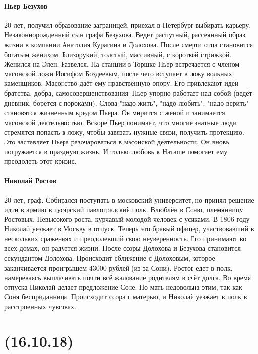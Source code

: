 \documentclass{article}
\begin{document}
\paragraph{Пьер Безухов}
20 лет, получил образование заграницей, приехал в Петербург выбирать карьеру. Незаконнорожденный сын графа Безухова.
Ведет распутный, рассеянный образ жизни в компании Анатолия Курагина и Долохова. После смерти отца становится
богатым женихом. Близорукий, толстый, массивный, с короткой стрижкой. Женился на Элен. Развелся.
На станции в Торшке Пьер встречается с членом масонской ложи Иосифом Боздеевым, после чего вступает в ложу вольных
каменщиков. Масонство даёт ему нравственную опору. Его привлекают идеи братства, добра, самосовершенствования.
Пьер упорно работает над собой (ведёт дневник, борется с пороками). Слова "надо жить", "надо любить", "надо верить"
становятся жизненным кредом Пьера. Он мирится с женой и занимается масонской деятельностью. Вскоре Пьер понимает,
что многие знатные люди стремятся попасть в ложу, чтобы завязать нужные связи, получить протекцию. Это заставляет
Пьера разочароваться в масонской деятельности. Он вновь погружается в праздную жизнь. И только любовь к Наташе
помогает ему преодолеть этот кризис.
\paragraph{Николай Ростов}
20 лет, граф. Собирался поступать в московский университет, но принял решение идти в армию в гусарский павлоградский
полк. Влюблён в Соню, племянницу Ростовых. Невысокого роста, курчавый молодой человек с усиками.
В 1806 году Николай уезжает в Москву в отпуск.
Теперь это бравый офицер, участвовавший в нескольких сражениях и преодолевший свою неуверенность. Его принимают
во всех домах, он радуется жизни. После ссоры Долохова и Безухова становится секундантом Долохова.
Происходит сближение с Долоховым, которое заканчивается проигрышем 43000 рублей (из-за Сони). Ростов едет в полк,
намереваясь выплачивать почти всё жалование родителям в счёт долга. Во время отпуска Николай делает предложение
Соне. Но мать недовольна этим, так как Соня бесприданница. Происходит ссора с матерью, и Николай уезжает в полк
в расстроенных чувствах.

\newpage
\noindent\makebox[\linewidth]{\rule{\paperwidth}{0.4pt}}
\section{(16.10.18)}
\noindent\makebox[\linewidth]{\rule{\paperwidth}{0.4pt}}
\end{document}
